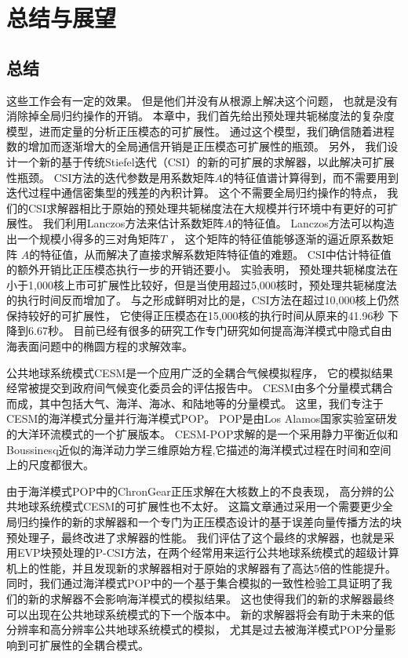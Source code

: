 \chapter{总结与展望}
\label{cha:conclusion}

\section{总结}
\label{sec:conclude}


这些工作会有一定的效果。 
但是他们并没有从根源上解决这个问题， 也就是没有消除掉全局归约操作的开销。 
本章中，我们首先给出预处理共轭梯度法的复杂度模型，进而定量的分析正压模态的可扩展性。 
通过这个模型，我们确信随着进程数的增加而逐渐增大的全局通信开销是正压模态可扩展性的瓶颈。 
另外，  我们设计一个新的基于传统Stiefel迭代（CSI）的新的可扩展的求解器，以此解决可扩展性瓶颈。 
CSI方法的迭代参数是用系数矩阵$A$的特征值谱计算得到，而不需要用到迭代过程中通信密集型的残差的內积计算。
这个不需要全局归约操作的特点， 我们的CSI求解器相比于原始的预处理共轭梯度法在大规模并行环境中有更好的可扩展性。  
我们利用Lanczos方法来估计系数矩阵$A$的特征值。 
Lanczos方法可以构造出一个规模小得多的三对角矩阵$T$ ， 这个矩阵的特征值能够逐渐的逼近原系数矩阵 $A$的特征值，从而解决了直接求解系数矩阵特征值的难题。 
CSI中估计特征值的额外开销比正压模态执行一步的开销还要小。 
实验表明， 预处理共轭梯度法在小于1,000核上市可扩展性比较好，但是当使用超过5,000核时，预处理共轭梯度法的执行时间反而增加了。 
与之形成鲜明对比的是，CSI方法在超过10,000核上仍然保持较好的可扩展性， 它使得正压模态在15,000核的执行时间从原来的41.96秒 下降到6.67秒。    
目前已经有很多的研究工作专门研究如何提高海洋模式中隐式自由海表面问题中的椭圆方程的求解效率。 

公共地球系统模式CESM是一个应用广泛的全耦合气候模拟程序\cite{hurrell2013community}， 它的模拟结果经常被提交到政府间气候变化委员会的评估报告中\cite{stocker2013ipcc}。
CESM由多个分量模式耦合而成，其中包括大气、海洋、海冰、和陆地等的分量模式。 
这里，我们专注于CESM的海洋模式分量并行海洋模式POP。 POP是由Los Alamos国家实验室研发的大洋环流模式的一个扩展版本。 
CESM-POP求解的是一个采用静力平衡近似和Boussinesq近似的海洋动力学三维原始方程,它描述的海洋模式过程在时间和空间上的尺度都很大。  


由于海洋模式POP中的ChronGear正压求解在大核数上的不良表现， 高分辨的公共地球系统模式CESM的可扩展性也不太好。
这篇文章通过采用一个需要更少全局归约操作的新的求解器和一个专门为正压模态设计的基于误差向量传播方法的块预处理子，最终改进了求解器的性能。 
我们评估了这个最终的求解器，也就是采用EVP块预处理的P-CSI方法，在两个经常用来运行公共地球系统模式的超级计算机上的性能，并且发现新的求解器相对于原始的求解器有了高达5倍的性能提升。
同时，我们通过海洋模式POP中的一个基于集合模拟的一致性检验工具证明了我们的新的求解器不会影响海洋模式的模拟结果。 
这也使得我们的新的求解器最终可以出现在公共地球系统模式的下一个版本中。 
新的求解器将会有助于未来的低分辨率和高分辨率公共地球系统模式的模拟， 尤其是过去被海洋模式POP分量影响到可扩展性的全耦合模式。 




